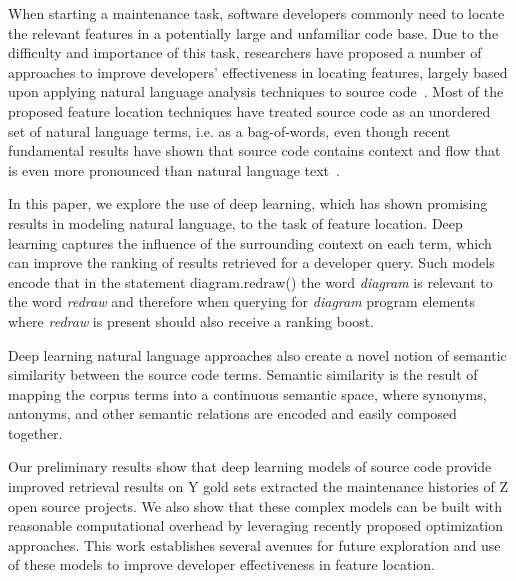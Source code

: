
% 
%
When starting a maintenance task, software developers commonly need to
locate the relevant features in a potentially large and unfamiliar
code base. Due to the difficulty and importance of this task,
researchers have proposed a number of approaches to improve
developers' effectiveness in locating features, largely based upon
applying natural language analysis techniques to source
code~\cite{dit_feature_2013}. Most of the proposed feature location
techniques have treated source code as an unordered set of natural
language terms, i.e. as a bag-of-words, even though recent fundamental
results have shown that source code contains context and flow that is
even more pronounced than natural language
text~\cite{hindle_naturalness_2012}.


%
%
In this paper, we explore the use of deep learning, which has shown
promising results in modeling natural language, to the task of feature
location. Deep learning captures the influence of the surrounding
context on each term, which can improve the ranking of results
retrieved for a developer query. Such models encode that in the
statement {\sf diagram.redraw()} the word {\em diagram} is relevant
to the word {\em redraw} and therefore when querying for {\em
diagram} program elements where {\em redraw} is present should also
receive a ranking boost.

Deep learning natural language approaches also create a novel notion
of semantic similarity between the source code terms. Semantic
similarity is the result of mapping the corpus terms into a continuous
semantic space, where synonyms, antonyms, and other semantic relations
are encoded and easily composed together.



%
%

Our preliminary results show that deep learning models of source code
provide improved retrieval results on Y gold sets extracted the
maintenance histories of Z open source projects. We also show that these
complex models can be built with reasonable computational overhead by
leveraging recently proposed optimization approaches. This work
establishes several avenues for future exploration and use of these
models to improve developer effectiveness in feature location.



